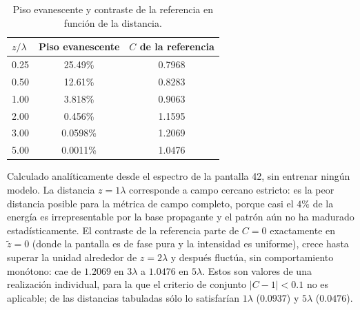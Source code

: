 \begin{table}[htbp]
\centering
\begin{threeparttable}
\caption{Piso evanescente y contraste de la referencia en función de la distancia.}
\label{tab:nb03_piso}
\begin{tabular}{lcc}
\toprule
$z/\lambda$ & Piso evanescente & $C$ de la referencia \\
\midrule
0.25 & 25.49\% & 0.7968 \\
0.50 & 12.61\% & 0.8283 \\
1.00 & 3.818\% & 0.9063 \\
2.00 & 0.456\% & 1.1595 \\
3.00 & 0.0598\% & 1.2069 \\
5.00 & 0.0011\% & 1.0476 \\
\bottomrule
\end{tabular}
\begin{tablenotes}\small
    \item Calculado analíticamente desde el espectro de la pantalla 42, sin
    entrenar ningún modelo. La distancia $z=1\lambda$ corresponde a
    campo cercano estricto: es la peor distancia posible para la métrica de
    campo completo, porque casi el $4\%$ de la energía es irrepresentable por
    la base propagante y el patrón aún no ha madurado estadísticamente. El
    contraste de la referencia parte de $C=0$ exactamente en $\tilde z=0$
    (donde la pantalla es de fase pura y la intensidad es uniforme), crece
    hasta superar la unidad alrededor de $z=2\lambda$ y después fluctúa,
    sin comportamiento monótono: cae de $1.2069$ en $3\lambda$ a $1.0476$ en
    $5\lambda$. Estos son valores de una realización individual, para la que el
    criterio de conjunto $|C-1|<0.1$ no es aplicable; de las distancias
    tabuladas sólo lo satisfarían $1\lambda$ ($0.0937$) y $5\lambda$ ($0.0476$).
\end{tablenotes}
\end{threeparttable}
\end{table}

